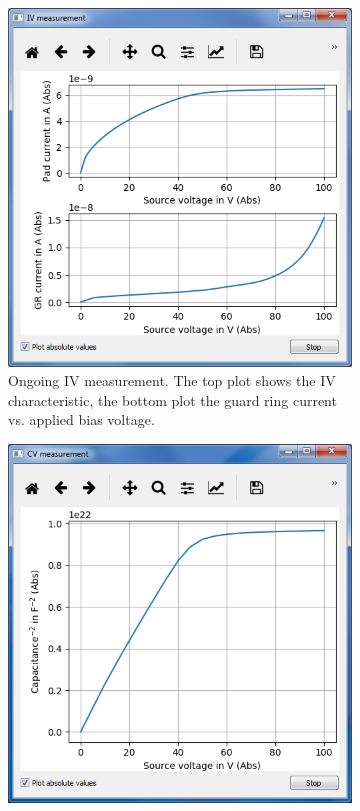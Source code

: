 \documentclass[a4paper]{article}
\begin{document}
\begin{figure}[hbtp]
\centering
\begin{subfigure}[t]{0.475\textwidth}
\centering\captionsetup{width=.8\linewidth}%
\includegraphics[width=\linewidth]{pictures/ivmeas.png}
\caption[Running IV Measurement]{Ongoing IV measurement. The top plot shows the IV characteristic, the bottom plot the guard ring current vs. applied bias voltage.}
\label{fig:ivmeas}
\end{subfigure}
\begin{subfigure}[t]{0.475\textwidth}
\centering\captionsetup{width=.8\linewidth}%
\includegraphics[width=\linewidth]{pictures/cvmeas.png}

\end{subfigure}
\end{figure}
\end{document}
